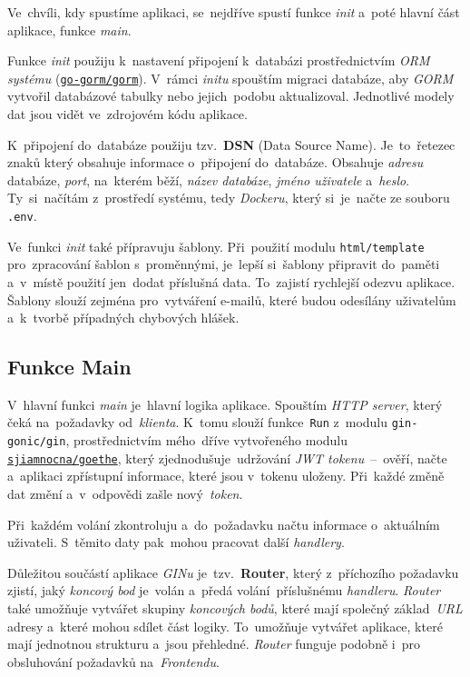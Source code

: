 \documentclass[11pt,a4paper]{report}
\begin{document}
            Ve~chvíli, kdy spustíme aplikaci, se~nejdříve spustí funkce \emph{init} a~poté hlavní část aplikace, funkce \emph{main}.
            
            Funkce \emph{init} použiju k~nastavení připojení k~databázi prostřednictvím \emph{ORM systému} (\href{https://gorm.io/}{\texttt{go-gorm/gorm}}). V~rámci \emph{initu} spouštím migraci databáze, aby \emph{GORM} vytvořil databázové tabulky nebo jejich~podobu aktualizoval. Jednotlivé modely dat jsou vidět ve~zdrojovém kódu aplikace.

            K~připojení do~databáze použiju tzv.~\textbf{DSN} (Data Source Name). Je~to~řetezec znaků který obsahuje informace o~připojení do~databáze. Obsahuje \emph{adresu} databáze, \emph{port}, na~kterém běží, \emph{název databáze}, \emph{jméno uživatele} a~\emph{heslo}. Ty~si~načítám z~prostředí systému, tedy \emph{Dockeru}, který si~je~načte ze souboru \texttt{.env}.

            Ve~funkci \emph{init} také přípravuju šablony. Při~použití modulu \texttt{html/template} pro~zpracování šablon s~proměnnými, je~lepší si~šablony připravit do~paměti a~v~místě použití jen~dodat příslušná data. To~zajistí rychlejší odezvu aplikace. Šablony slouží zejména pro~vytváření e-mailů, které budou odesílány uživatelům a~k~tvorbě případných chybových hlášek.

        \subsection{Funkce Main}
            V~hlavní funkci \emph{main} je~hlavní logika aplikace. Spouštím \emph{HTTP server}, který čeká na~požadavky od~\emph{klienta}. K~tomu slouží funkce~\texttt{Run} z~modulu \texttt{gin-gonic/gin}, prostřednictvím mého~dříve vytvořeného modulu \href{https://gitlab.com/sjiamnocna/goethe}{\texttt{sjiamnocna/goethe}}, který zjednodušuje~udržování \emph{JWT tokenu}~--~ověří, načte a~aplikaci zpřístupní informace, které jsou v~tokenu uloženy. Při~každé změně dat změní a~v~odpovědi zašle nový~\emph{token}.
            
            Při~každém volání zkontroluju a~do~požadavku načtu informace o~aktuálním uživateli. S~těmito daty pak~mohou pracovat další \emph{handlery}.

            Důležitou součástí aplikace \emph{GINu} je~tzv.~\textbf{Router}, který z~příchozího požadavku zjistí, jaký \emph{koncový bod} je~volán a~předá volání~příslušnému \emph{handleru}. \emph{Router} také umožňuje vytvářet skupiny \emph{koncových bodů}, které mají společný základ~\emph{URL} adresy a~které mohou sdílet část logiky. To~umožňuje vytvářet aplikace, které mají jednotnou strukturu a~jsou přehledné. \emph{Router} funguje podobně i~pro obsluhování požadavků na~\emph{Frontendu}.
\end{document}
